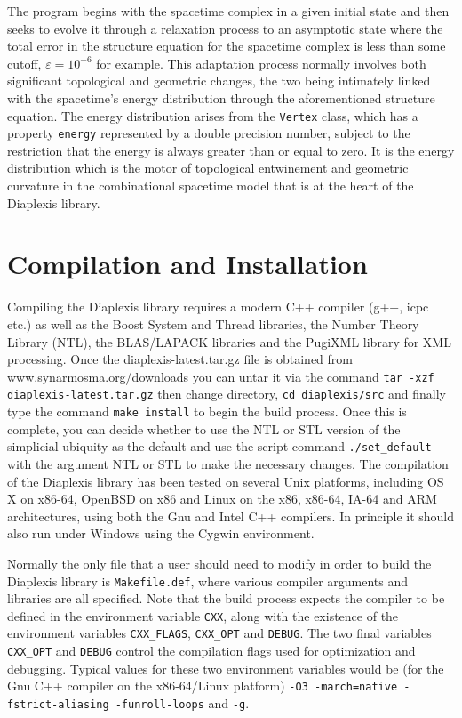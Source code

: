 \documentclass[12pt,letterpaper]{report}
\begin{document}
The program begins with the spacetime complex in a given initial state and then seeks to 
evolve it through a relaxation process to an asymptotic state where the total error in the 
structure equation for the spacetime complex is less than some cutoff, $\varepsilon = 10^{-6}$ 
for example. This adaptation process normally involves both significant topological and 
geometric changes, the two being intimately linked with the spacetime's energy distribution 
through the aforementioned structure equation. The energy distribution arises from the 
\texttt{Vertex} class, which has a property \texttt{energy} represented by a double precision 
number, subject to the restriction that the energy is always greater than or equal to zero. 
It is the energy distribution which is the motor of topological entwinement and geometric 
curvature in the combinational spacetime model that is at the heart of the Diaplexis library.  

\section{Compilation and Installation}

Compiling the Diaplexis library requires a modern C++ compiler (g++, icpc etc.) as well as 
the Boost System and Thread libraries, the Number Theory Library (NTL), the BLAS/LAPACK 
libraries and the PugiXML library for XML processing. Once the diaplexis-latest.tar.gz file is 
obtained from www.synarmosma.org/downloads you can untar it via the command\newline
\texttt{tar -xzf diaplexis-latest.tar.gz}\newline
then change directory,\newline
\texttt{cd diaplexis/src}\newline  
and finally type the command \texttt{make install} to begin the build process. Once this is 
complete, you can decide whether to use the NTL or STL version of the simplicial ubiquity 
as the default and use the script command \texttt{./set\_default} with the argument NTL or STL 
to make the necessary changes. The compilation of the Diaplexis library has been tested on 
several Unix platforms, including OS X on x86-64, OpenBSD on x86 and Linux on the x86, x86-64, 
IA-64 and ARM architectures, using both the Gnu and Intel C++ compilers. In principle it should 
also run under Windows using the Cygwin environment. 

Normally the only file that a user should need to modify in order to build the Diaplexis library 
is \texttt{Makefile.def}, where various compiler arguments and libraries are all specified. Note that 
the build process expects the compiler to be defined in the environment variable \texttt{CXX}, along 
with the existence of the environment variables \texttt{CXX\_FLAGS}, \texttt{CXX\_OPT} and \texttt{DEBUG}. 
The two final variables \texttt{CXX\_OPT} and \texttt{DEBUG} control the compilation flags used for 
optimization and debugging. Typical values for these two environment variables would be (for the Gnu 
C++ compiler on the x86-64/Linux platform) \texttt{-O3 -march=native -fstrict-aliasing -funroll-loops} 
and \texttt{-g}.
\end{document}
